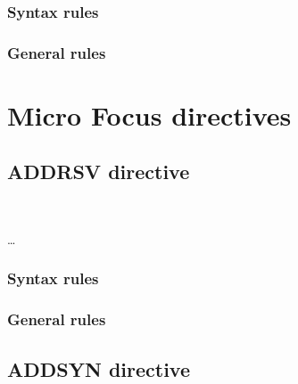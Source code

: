 \begin{syntax}
\end{syntax}

\subsubsection{Syntax rules}

\subsubsection{General rules}

\section{Micro Focus directives}

\subsection{ADDRSV directive}

\begin{syntax}[\miscextcolour]
  \begin{1=}
     \\
  \end{1=}
  \literal \dots %
\end{syntax}

\subsubsection{Syntax rules}

\subsubsection{General rules}

\subsection{ADDSYN directive}

